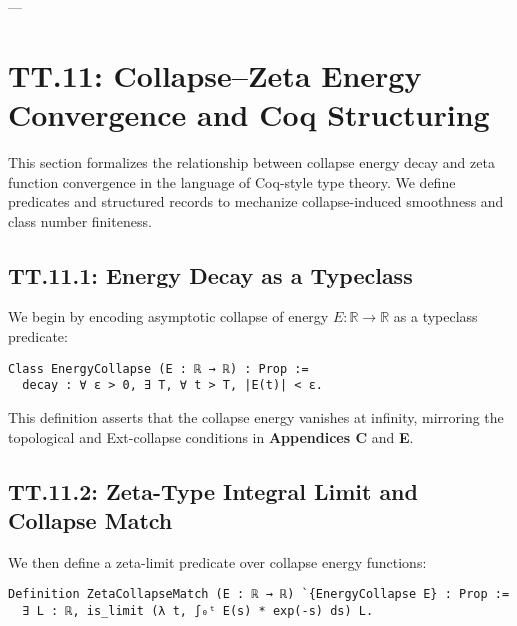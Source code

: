 \documentclass[11pt]{article}
\begin{document}
\begin{center}
\end{center}

---

\section*{TT.11: Collapse–Zeta Energy Convergence and Coq Structuring}

This section formalizes the relationship between collapse energy decay and zeta function convergence  
in the language of Coq-style type theory. We define predicates and structured records to mechanize  
collapse-induced smoothness and class number finiteness.

\subsection*{TT.11.1: Energy Decay as a Typeclass}

We begin by encoding asymptotic collapse of energy \( E : \mathbb{R} \to \mathbb{R} \) as a typeclass predicate:

\begin{verbatim}
Class EnergyCollapse (E : ℝ → ℝ) : Prop :=
  decay : ∀ ε > 0, ∃ T, ∀ t > T, |E(t)| < ε.
\end{verbatim}

This definition asserts that the collapse energy vanishes at infinity,  
mirroring the topological and Ext-collapse conditions in \textbf{Appendices C} and \textbf{E}.

\subsection*{TT.11.2: Zeta-Type Integral Limit and Collapse Match}

We then define a zeta-limit predicate over collapse energy functions:

\begin{verbatim}
Definition ZetaCollapseMatch (E : ℝ → ℝ) `{EnergyCollapse E} : Prop :=
  ∃ L : ℝ, is_limit (λ t, ∫₀ᵗ E(s) * exp(-s) ds) L.
\end{verbatim}
\end{document}
